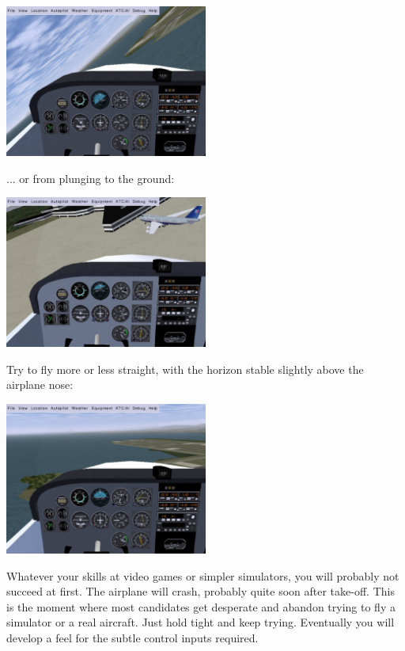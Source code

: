 \begin{center}
\includegraphics[width=0.5\textwidth]{img/tut_12}
\end{center}

... or from plunging to the ground:


\begin{center}
\includegraphics[width=0.5\textwidth]{img/tut_13}
\end{center}

Try to fly more or less straight, with the horizon stable slightly above the
airplane nose:

\begin{center}
\includegraphics[width=0.5\textwidth]{img/tut_15}
\end{center}

Whatever your skills at video games or simpler simulators, you will probably
not succeed at first. The airplane will crash, probably quite soon after
take-off. This is the moment where most candidates get desperate and abandon
trying to fly a simulator or a real aircraft. Just hold tight and keep trying.
Eventually you will develop a feel for the subtle control inputs required.


